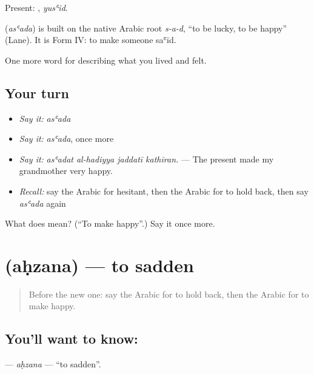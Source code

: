 Present: , \emph{yusʿid}.

\begin{cousinweb}
\textbf{} (\emph{asʿada}) is built on the native Arabic root \emph{s-a-d}, \textquotedblleft{}to be lucky, to be happy\textquotedblright{} (Lane). It is Form IV: to make someone saʿīd.
\end{cousinweb}

\begin{grammarlens}[title={What you've built}]
One more word for describing what you lived and felt.
\end{grammarlens}

\subsection*{Your turn}
\begin{itemize}
\raggedright
  \item \emph{Say it:} \emph{asʿada}
  \item \emph{Say it:} \emph{asʿada}, once more
  \item \emph{Say it:} \emph{asʿadat al-hadiyya jaddatī kathīran.} — The present made my grandmother very happy.
  \item \emph{Recall:} say the Arabic for hesitant, then the Arabic for to hold back, then say \emph{asʿada} again
\end{itemize}

\begin{tcolorbox}[breakable,colback=teal!4,colframe=teal!35!black,title={Before you move on}]
What does  mean? (\textquotedblleft{}To make happy\textquotedblright{}.) Say it once more.
\end{tcolorbox}
\section[\texorpdfstring{\ar{أحزن} (aḥzana)}{أحزن (aḥzana)}]{ (aḥzana) — to sadden}

\label{lesson:AR-C498-ahzana}



\begin{quote}
Before the new one: say the Arabic for to hold back, then the Arabic for to make happy.
\end{quote}

\subsection*{You'll want to know: }
\textbf{} — \emph{aḥzana} — \textquotedblleft{}to sadden\textquotedblright{}.

